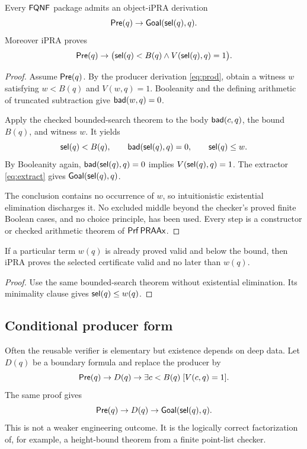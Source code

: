 \begin{theorem}\label{thm:fqnf-compile}
Every \(\mathsf{FQNF}\) package admits an object-iPRA derivation
\[
  \mathsf{Pre}(q)\to\mathsf{Goal}(\mathsf{sel}(q),q).
\]
Moreover iPRA proves
\[
  \mathsf{Pre}(q)\to
  \bigl(\mathsf{sel}(q)<B(q)\wedge V(\mathsf{sel}(q),q)=1\bigr).
\]
\end{theorem}

\begin{proof}
Assume \(\mathsf{Pre}(q)\).  By the producer derivation
\eqref{eq:prod}, obtain a witness \(w\) satisfying
\(w<B(q)\) and \(V(w,q)=1\).  Booleanity and the defining arithmetic of
truncated subtraction give \(\mathsf{bad}(w,q)=0\).

Apply the checked bounded-search theorem to the body \(\mathsf{bad}(c,q)\), the bound
\(B(q)\), and witness \(w\).  It yields
\[
  \mathsf{sel}(q)<B(q),\qquad \mathsf{bad}(\mathsf{sel}(q),q)=0,
  \qquad \mathsf{sel}(q)\le w.
\]
By Booleanity again, \(\mathsf{bad}(\mathsf{sel}(q),q)=0\) implies
\(V(\mathsf{sel}(q),q)=1\).  The extractor \eqref{eq:extract} gives
\(\mathsf{Goal}(\mathsf{sel}(q),q)\).

The conclusion contains no occurrence of \(w\), so intuitionistic existential
elimination discharges it.  No excluded middle beyond the checker's proved
finite Boolean cases, and no choice principle, has been used.  Every step is a
constructor or checked arithmetic theorem of \(\mathsf{Prf}\,\mathsf{PRAAx}\).
\end{proof}

\begin{corollary}
If a particular term \(w(q)\) is already proved valid and below the bound, then
iPRA proves the selected certificate valid and no later than \(w(q)\).
\end{corollary}

\begin{proof}
Use the same bounded-search theorem without existential elimination.  Its
minimality clause gives \(\mathsf{sel}(q)\le w(q)\).
\end{proof}

\subsection{Conditional producer form}

Often the reusable verifier is elementary but existence depends on deep data.
Let \(D(q)\) be a boundary formula and replace the producer by
\[
  \mathsf{Pre}(q)\to D(q)\to
  \exists c<B(q)\;[V(c,q)=1].
\]
The same proof gives
\[
  \mathsf{Pre}(q)\to D(q)\to\mathsf{Goal}(\mathsf{sel}(q),q).
\]
This is not a weaker engineering outcome.  It is the logically correct
factorization of, for example, a height-bound theorem from a finite point-list
checker.

